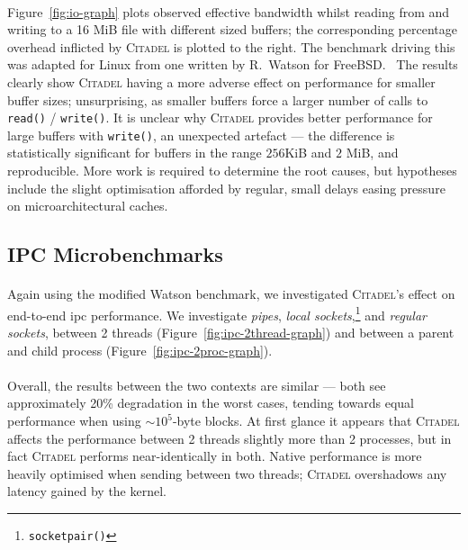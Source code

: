 \paragraph{} Figure~\ref{fig:io-graph} plots observed effective bandwidth whilst reading from and writing to a 16 MiB file with different sized buffers; the corresponding percentage overhead inflicted by \textsc{Citadel} is plotted to the right. The benchmark driving this was adapted for Linux from one written by R.~Watson for FreeBSD.~\cite{l41-benchmark} The results clearly show \textsc{Citadel} having a more adverse effect on performance for smaller buffer sizes; unsurprising, as smaller buffers force a larger number of calls to \texttt{read()} / \texttt{write()}. It is unclear why \textsc{Citadel} provides better performance for large buffers with \texttt{write()}, an unexpected artefact --- the difference is statistically significant for buffers in the range $256$KiB and $2$ MiB, and reproducible. More work is required to determine the root causes, but hypotheses include the slight optimisation afforded by regular, small delays easing pressure on microarchitectural caches.





\subsection{IPC Microbenchmarks}
\label{sec:ipc-microbenchmarks}

\paragraph{} Again using the modified Watson benchmark, we investigated \textsc{Citadel}'s effect on end-to-end \acrshort{ipc} performance. We investigate \textit{pipes}, \textit{local sockets},\footnote{\texttt{socketpair()}} and \textit{regular sockets}, between 2 threads (Figure~\ref{fig:ipc-2thread-graph}) and between a parent and child process (Figure~\ref{fig:ipc-2proc-graph}).

\paragraph{} Overall, the results between the two contexts are similar --- both see approximately 20\% degradation in the worst cases, tending towards equal performance when using $\sim 10^5$-byte blocks. At first glance it appears that \textsc{Citadel} affects the performance between 2 threads slightly more than 2 processes, but in fact \textsc{Citadel} performs near-identically in both. Native performance is more heavily optimised when sending between two threads; \textsc{Citadel} overshadows any latency gained by the kernel.

